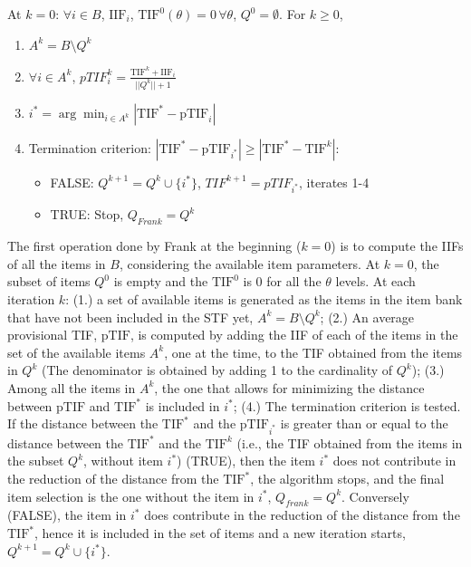 \documentclass{svproc}
\begin{document}
At $k = 0$: $\forall i \in B$, $\text{IIF}_i$, $\text{TIF}^0(\theta) = 0 \, \forall \theta$, $Q^0 = \emptyset$. For $k \geq 0$,

\begin{enumerate}
	\item  $A^k = B \setminus Q^k$ 
	\item $\forall i \in A^k$, $pTIF_{i}^k = \frac{\text{TIF}^k + \text{IIF}_{i}}{||Q^k||+1}$
	\item $i^* = \arg \min_{i \in A^k} |\text{TIF}^* - \text{pTIF}_i|$
	\item Termination criterion: $|\text{TIF}^* - \text{pTIF}_{i^*}| \geq |\text{TIF}^* - \text{TIF}^{k}|$: 
	\begin{itemize}
		\item FALSE:  $Q^{k+1} = Q^{k} \cup \{i^*\}$, $TIF^{k+1} = pTIF_{i^*}$, iterates 1-4 
		\item TRUE: Stop, %
		$Q_{Frank} = Q^k$
		
	\end{itemize}
\end{enumerate}

The first operation done by Frank at the beginning ($k=0$) is to compute the IIFs of all the items in $B$, considering the available item parameters.
At $k = 0$, the subset of items $Q^0$ is empty and the $\text{TIF}^0$ is 0 for all the $\theta$ levels. 
At each iteration $k$: (1.) a set of available items is generated as the items in the item bank that have not been included in the STF yet, $A^k = B \setminus Q^k$; (2.)
An average provisional TIF, $\text{pTIF}$, is computed by adding the IIF of each of the items in the set of the available items $A^k$, one at the time, to the TIF obtained from the items in $Q^k$ (The denominator is obtained by adding 1 to the cardinality of $Q^k$); (3.) Among all the items in $A^k$, the one that allows for minimizing the distance between $\text{pTIF}$ and $\text{TIF}^*$ is included in $i^*$; (4.) 
The termination criterion is tested. 
If the distance between the $\text{TIF}^*$ and the $\text{pTIF}_{i^*}$ is greater than or equal to the distance between the $\text{TIF}^*$ and the $\text{TIF}^k$ (i.e., the TIF obtained from the items in the subset $Q^k$, without item $i^*$) (TRUE), then the item $i^*$ does not contribute in the reduction of the distance from the $\text{TIF}^*$, the algorithm stops, and the final item selection is the one without the item in $i^*$, $Q_{frank} = Q^k$. Conversely (FALSE), the item in $i^*$ does contribute in the reduction of the distance from the $\text{TIF}^*$, hence it is included in the set of items and a new iteration starts, $Q^{k+1} = Q^k \cup \{i^*\}$.
\end{document}
